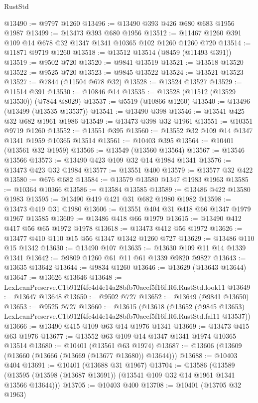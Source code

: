\begin{lexlean}{RustStd}
\begin{coremodule}
@13490 := @9797 @1260
@13496 := @13490 @393 @426 @680 @683 @1956 @1987
@13499 := @13473 @393 @680 @1956
@13512 := @11467 @1260 @391 @109 @14 @678 @32 @1347 @1341 @10365 @102 @1260 @1260 @720
@13514 := @11871 @9719 @1260
@13518 := @13512 @13514 (@8459 (@11493 @391))
@13519 := @9502 @720
@13520 := @9841 @13519
@13521 := @13518 @13520
@13522 := @9525 @720
@13523 := @9845 @13522
@13524 := @13521 @13523
@13527 := @7844 (@11504 @678 @32)
@13528 := @13524 @13527
@13529 := @11514 @391
@13530 := @10846 @14
@13535 := @13528 (@11512 (@13529 @13530)) (@7844 @8029)
@13537 := @5519 (@10866 @1260)
@13540 := @13496 (@13499 (@13535 @13537))
@13541 := @13490 @398
@13546 := @13541 @425 @32 @682 @1961 @1986
@13549 := @13473 @398 @32 @1961
@13551 := @10351 @9719 @1260
@13552 := @13551 @395
@13560 := @13552 @32 @109 @14 @1347 @1341 @1959 @10365 @13514
@13561 := @10403 @395
@13564 := @10401 (@13561 @32 @1959)
@13566 := @13549 (@13560 @13564)
@13567 := @13546 @13566
@13573 := @13490 @423 @109 @32 @14 @1984 @1341
@13576 := @13473 @423 @32 @1984
@13577 := @13551 @400
@13579 := @13577 @32 @422
@13580 := @676 @682
@13584 := @13579 @13580 @1347 @1983 @1963
@13585 := @10364 @10366
@13586 := @13584 @13585
@13589 := @13486 @422 @13580 @1983
@13595 := @13490 @419 @421 @31 @682 @1980 @1982
@13598 := @13473 @419 @31 @1980
@13606 := @13551 @404 @31 @418 @66 @1347 @1979 @1967 @13585
@13609 := @13486 @418 @66 @1979
@13615 := @13490 @412 @417 @56 @65 @1972 @1978
@13618 := @13473 @412 @56 @1972
@13626 := @13477 @410 @110 @15 @56 @1347 @1342 @1260 @727
@13629 := @13486 @110 @15 @1342
@13630 := @13490 @107
@13635 := @13630 @109 @11 @14 @1339 @1341
@13642 := @9809 @1260 @61 @11 @61 @1339 @9820 @9827
@13643 := @13635 @13642
@13644 := @9834 @1260
@13646 := @13629 (@13643 @13644)
@13647 := @13626 @13646
@13648 := LexLeanPreserve.C1b912f4fc4d4e14a28bfb70aeef5f16f.R6.RustStd.look11
@13649 := @13647 @13648
@13650 := @9502 @727
@13652 := @13649 (@9841 @13650)
@13653 := @9525 @727
@13660 := @13615
    (@13618
      (@13652
        (@9845 @13653)
        LexLeanPreserve.C1b912f4fc4d4e14a28bfb70aeef5f16f.R6.RustStd.fal11
        @13537))
@13666 := @13490 @415 @109 @63 @14 @1976 @1341
@13669 := @13473 @415 @63 @1976
@13677 := @13552 @63 @109 @14 @1347 @1341 @1974 @10365 @13514
@13680 := @10401 (@13561 @63 @1974)
@13687 := @13606 (@13609 (@13660 (@13666 (@13669 (@13677 @13680)) @13644)))
@13688 := @10403 @404
@13691 := @10401 (@13688 @31 @1967)
@13704 := @13586
    (@13589 (@13595 (@13598 (@13687 @13691)) (@13541 @109 @32 @14 @1961 @1341 @13566 @13644)))
@13705 := @10403 @400
@13708 := @10401 (@13705 @32 @1963)

\end{coremodule}
\end{lexlean}
